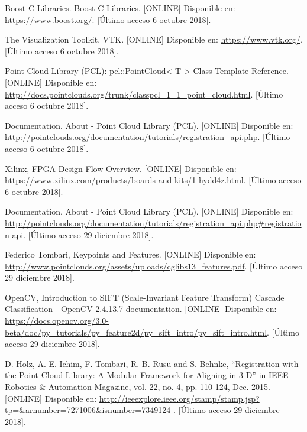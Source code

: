 \begin{thebibliography}{99}
 Boost C Libraries. Boost C Libraries. [ONLINE] Disponible en: \url{ https://www.boost.org/}. [Último acceso 6 octubre 2018].


 The Visualization Toolkit. VTK. [ONLINE] Disponible en: \url{https://www.vtk.org/}. [Último acceso 6 octubre 2018].

 Point Cloud Library (PCL): pcl::PointCloud< T > Class Template Reference. [ONLINE] Disponible en: \url{http://docs.pointclouds.org/trunk/classpcl_1_1_point_cloud.html}. [Último acceso 6 octubre 2018].


 Documentation. About - Point Cloud Library (PCL).  [ONLINE] Disponible en: \url{http://pointclouds.org/documentation/tutorials/registration_api.php}. [Último acceso 6 octubre 2018].


Xilinx, FPGA Design Flow Overview.   [ONLINE] Disponible en: \url{https://www.xilinx.com/products/boards-and-kits/1-hydd4z.html}. [Último acceso 6 octubre 2018].



 Documentation. About - Point Cloud Library (PCL).   [ONLINE] Disponible en: \url{http://pointclouds.org/documentation/tutorials/registration_api.php#registration-api}. [Último acceso 29 diciembre 2018].



 Federico Tombari, Keypoints and Features.   [ONLINE] Disponible en: \url{http://www.pointclouds.org/assets/uploads/cglibs13_features.pdf}. [Último acceso 29 diciembre 2018].



 OpenCV,  Introduction to SIFT (Scale-Invariant Feature Transform) Cascade Classification - OpenCV 2.4.13.7 documentation.   [ONLINE] Disponible en: \url{https://docs.opencv.org/3.0-beta/doc/py_tutorials/py_feature2d/py_sift_intro/py_sift_intro.html}. [Último acceso 29 diciembre 2018].


 D. Holz, A. E. Ichim, F. Tombari, R. B. Rusu and S. Behnke, ``Registration with the Point Cloud Library: A Modular Framework for Aligning in 3-D'' in IEEE Robotics \& Automation Magazine, vol. 22, no. 4, pp. 110-124, Dec. 2015.   [ONLINE] Disponible en: \url{http://ieeexplore.ieee.org/stamp/stamp.jsp?tp=&arnumber=7271006&isnumber=7349124
}. [Último acceso 29 diciembre 2018].



\end{thebibliography}
